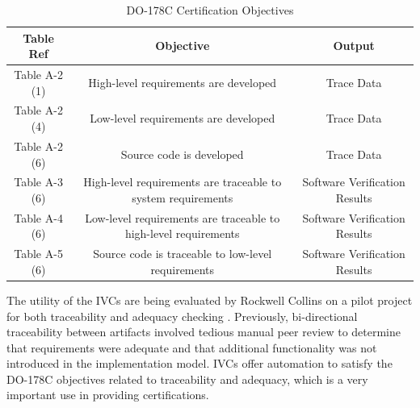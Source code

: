 \begin{table}
  \caption{DO-178C Certification Objectives}
  \centering
  \begin{tabular}{ |c|c|c| }
    \hline
     Table Ref & Objective & Output  \\[0.5ex]
    \hline\hline
    Table A-2 (1) & High-level requirements are developed & Trace Data \\
    Table A-2 (4) & Low-level requirements are developed & Trace Data \\
    Table A-2 (6) & Source code is developed & Trace Data \\
    Table A-3 (6) & High-level requirements are traceable to system requirements & Software Verification Results \\
    Table A-4 (6) & Low-level requirements are traceable to high-level requirements & Software Verification Results \\
    Table A-5 (6) & Source code is traceable to low-level requirements & Software Verification Results \\
    \hline
  \end{tabular}
  \label{tab:do178c}
\end{table}

The utility of the IVCs are being evaluated by Rockwell Collins on a pilot project for both traceability and adequacy checking \cite{lucas17}. Previously, bi-directional traceability between artifacts involved tedious manual peer review to determine that requirements were adequate and that additional functionality was not introduced in the implementation model. IVCs offer automation to satisfy the DO-178C objectives related to traceability and adequacy, which is a very important use in providing certifications.





